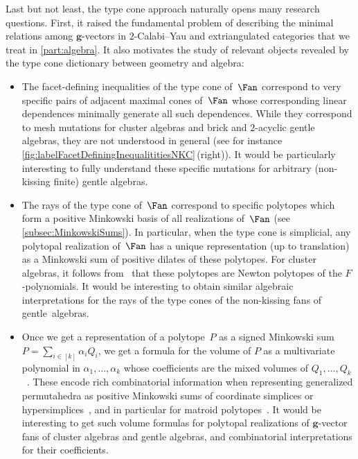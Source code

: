 \documentclass{amsart}
\theoremstyle{definition}
\renewcommand{\b}[1]{{\boldsymbol{#1}}} %
\begin{document}
\medskip
Last but not least, the type cone approach naturally opens many research questions.
First, it raised the fundamental problem of describing the minimal relations among $\b{g}$-vectors in $2$-Calabi--Yau and extriangulated categories that we treat in \cref{part:algebra}.
It also motivates the study of relevant objects revealed by the type cone dictionary between geometry and algebra:

\smallskip
\begin{itemize}
\item The facet-defining inequalities of the type cone of~$\Fan$ correspond to very specific pairs of adjacent maximal cones of~$\Fan$ whose corresponding linear dependences minimally generate all such dependences. While they correspond to mesh mutations for cluster algebras and brick and $2$-acyclic gentle algebras, they are not understood in general (see for instance \cref{fig:labelFacetDefiningInequalititiesNKC}\,(right)). It would be particularly interesting to fully understand these specific mutations for arbitrary (non-kissing finite) gentle algebras.

\smallskip
\item The rays of the type cone of~$\Fan$ correspond to specific polytopes which form a positive Minkowski basis of all realizations of~$\Fan$ (see \cref{subsec:MinkowskiSums}). In particular, when the type cone is simplicial, any polytopal realization of~$\Fan$ has a unique representation (up to translation) as a Minkowski sum of positive dilates of these polytopes. For cluster algebras, it follows from~\cite[Sect.~6]{BazierMatteDouvilleMousavandThomasYildirim} that these polytopes are Newton polytopes of the $F$-polynomials. It would be interesting to obtain similar algebraic interpretations for the rays of the type cones of the non-kissing fans of gentle~algebras.

\smallskip
\item Once we get a representation of a polytope~$P$ as a signed Minkowski sum~$P = \sum_{i \in [k]} \alpha_i Q_i$, we get a formula for the volume of $P$ as a multivariate polynomial in $\alpha_1, \dots, \alpha_k$ whose coefficients are the mixed volumes of $Q_1, \dots, Q_k$~\cite{ArdilaBenedettiDoker, McMullen-Valuations}. These encode rich combinatorial information when representing generalized permutahedra as positive Minkowski sums of coordinate simplices or hypersimplices~\cite{Postnikov}, and in particular for matroid polytopes~\cite{ArdilaBenedettiDoker}. It would be interesting to get such volume formulas for polytopal realizations of $\b{g}$-vector fans of cluster algebras and gentle algebras, and combinatorial interpretations for their coefficients.
\end{itemize}
\end{document}

